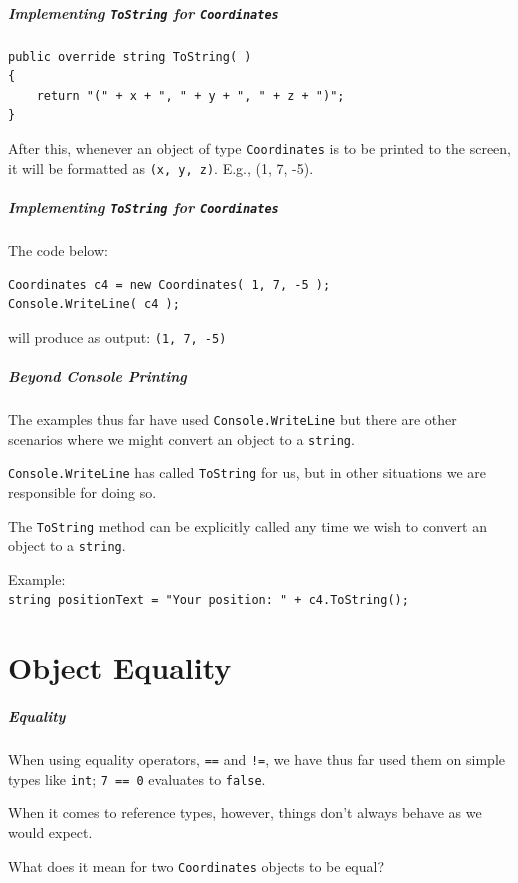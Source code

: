 \begin{frame}[fragile]
\frametitle{Implementing \texttt{ToString} for \texttt{Coordinates}}

\begin{verbatim}
public override string ToString( )
{
    return "(" + x + ", " + y + ", " + z + ")";
}
\end{verbatim}

After this, whenever an object of type \texttt{Coordinates} is to be printed to the screen, it will be formatted as \texttt{(x, y, z)}. E.g., (1, 7, -5).

\end{frame}


\begin{frame}[fragile]
\frametitle{Implementing \texttt{ToString} for \texttt{Coordinates}}

The code below:

\begin{verbatim}
Coordinates c4 = new Coordinates( 1, 7, -5 );
Console.WriteLine( c4 );
\end{verbatim}

will produce as output:
\texttt{(1, 7, -5)}

\end{frame}


\begin{frame}
\frametitle{Beyond Console Printing}

The examples thus far have used \texttt{Console.WriteLine} but there are other scenarios where we might convert an object to a \texttt{string}.

\texttt{Console.WriteLine} has called \texttt{ToString} for us, but in other situations we are responsible for doing so.

The \texttt{ToString} method can be explicitly called any time we wish to convert an object to a \texttt{string}.

Example:\\
 \texttt{string positionText = "Your position:~"~+~c4.ToString();}

\end{frame}

\part{Object Equality}
\begin{frame}\partpage\end{frame}

\begin{frame}
\frametitle{Equality}


When using equality operators, \texttt{==} and \texttt{!=}, we have thus far used them on simple types like \texttt{int}; \texttt{7 == 0} evaluates to \texttt{false}.

When it comes to reference types, however, things don't always behave as we would expect.

What does it mean for two \texttt{Coordinates} objects to be equal?

\end{frame}

